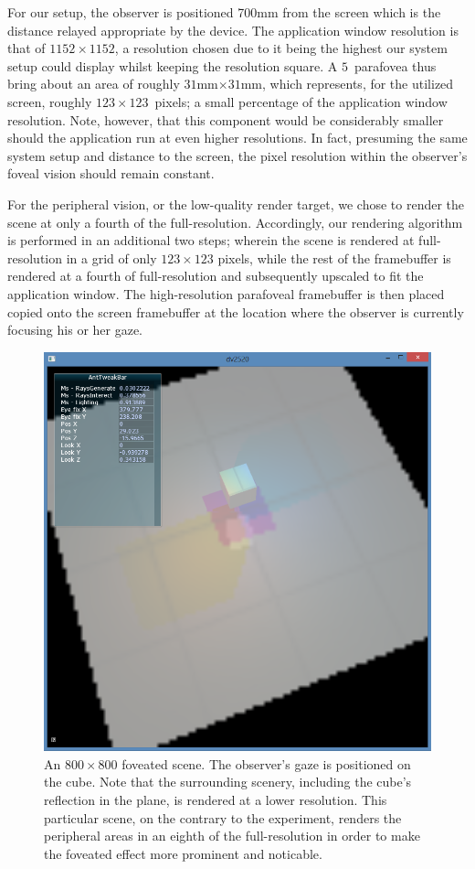 For our setup, the observer is positioned 700mm from the screen which is the distance relayed appropriate by the device.
The application window resolution is that of $1152\times 1152$, a resolution chosen due to it being the highest our system setup could display whilst keeping the resolution square.
A $5$\degree\ parafovea thus bring about an area of roughly $31$mm$\times $$31$mm, which represents, for the utilized screen, roughly $123\times 123$~pixels; a small percentage of the application window resolution.
Note, however, that this component would be considerably smaller should the application run at even higher resolutions.
In fact, presuming the same system setup and distance to the screen, the pixel resolution within the observer's foveal vision should remain constant.

For the peripheral vision, or the low-quality render target, we chose to render the scene at only a fourth of the full-resolution.
Accordingly, our rendering algorithm is performed in an additional two steps; wherein the scene is rendered at full-resolution in a grid of only $123\times 123$ pixels, while the rest of the framebuffer is rendered at a fourth of full-resolution and subsequently upscaled to fit the application window.
The high-resolution parafoveal framebuffer is then placed copied onto the screen framebuffer at the location where the observer is currently focusing his or her gaze.

\begin{figure}[p]
  \centering
  \includegraphics[width=1.0\linewidth]{img/fov_rt_et.png}
  \caption{An $800\times 800$ foveated scene. The observer's gaze is positioned on the cube. Note that the surrounding scenery, including the cube's reflection in the plane, is rendered at a lower resolution. This particular scene, on the contrary to the experiment, renders the peripheral areas in an eighth of the full-resolution in order to make the foveated effect more prominent and noticable.}
  \label{fig:fov}
\end{figure}

